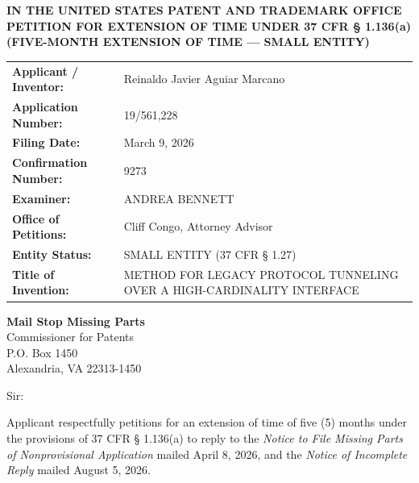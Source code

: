 \documentclass[11pt,letterpaper]{article}
\begin{document}
\thispagestyle{empty}

\begin{center}
    \textbf{\large IN THE UNITED STATES PATENT AND TRADEMARK OFFICE} \\
    \vspace{0.3cm}
    \textbf{\large PETITION FOR EXTENSION OF TIME UNDER 37 CFR \S{} 1.136(a)} \\
    \textbf{\normalsize (FIVE-MONTH EXTENSION OF TIME --- SMALL ENTITY)}
\end{center}

\vspace{0.4cm}
\noindent\begin{tabular}{p{2.3in}p{4.0in}}
\textbf{Applicant / Inventor:} & Reinaldo Javier Aguiar Marcano \\
\textbf{Application Number:} & 19/561,228 \\
\textbf{Filing Date:} & March 9, 2026 \\
\textbf{Confirmation Number:} & 9273 \\
\textbf{Examiner:} & ANDREA BENNETT \\
\textbf{Office of Petitions:} & Cliff Congo, Attorney Advisor \\
\textbf{Entity Status:} & SMALL ENTITY (37 CFR \S{} 1.27) \\
\textbf{Title of Invention:} & METHOD FOR LEGACY PROTOCOL TUNNELING OVER A HIGH-CARDINALITY INTERFACE \\
\end{tabular}

\vspace{0.5cm}
\noindent\textbf{Mail Stop Missing Parts} \\
Commissioner for Patents \\
P.O. Box 1450 \\
Alexandria, VA 22313-1450

\vspace{0.2cm}
Sir:

Applicant respectfully petitions for an extension of time of five (5) months under the provisions of 37 CFR \S{} 1.136(a) to reply to the \textit{Notice to File Missing Parts of Nonprovisional Application} mailed April 8, 2026, and the \textit{Notice of Incomplete Reply} mailed August 5, 2026.
\end{document}
